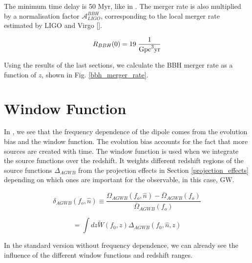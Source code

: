 The minimum time delay is 50 Myr, like in \cite{dallarmi_dipole_2022}. The merger rate is also multiplied by a normalisation factor $\mathcal{A}_{LIGO}^{BBH}$, corresponding to the local merger rate estimated by LIGO and Virgo [\cite{the_ligo_scientific_collaboration_population_2022}].

\begin{equation}
    R_{BBH}(0)=19 \; \frac{1}{\rm{Gpc}^3\rm{yr}}
\end{equation}



Using the results of the last sections, we calculate the BBH merger rate as a function of $z$, shown in Fig. \ref{bbh_merger_rate}.

\section{Window Function}
\label{window_fct_section}

In \cite{dallarmi_dipole_2022}, we see that the frequency dependence 
of the dipole comes from the evolution bias and the window function. The evolution 
bias accounts for the fact that more sources are created with time. The window 
function is used when we integrate the source functions over the redshift. It weights different redshift regions of the source functions $\Delta_{AGWB}$ from the projection effects in Section \ref{projection_effects} depending on which ones are important for the observable, in this case, GW.


\begin{equation}
    \delta_{AGWB}(f_o, \hat{n}) \equiv \frac{\Omega_{AGWB}(f_o, \hat{n})-\bar{\Omega}_{AGWB}(f_o)}{\bar{\Omega}_{AGWB}(f_o)}
\end{equation}

\begin{equation}
    =\int dz \tilde{W}(f_0, z)\Delta_{AGWB}(f_0, \hat{n}, z)
    \label{window_fct_int}
\end{equation}


In the standard version without frequency dependence, we can already see the influence of the different window functions and redshift ranges.

